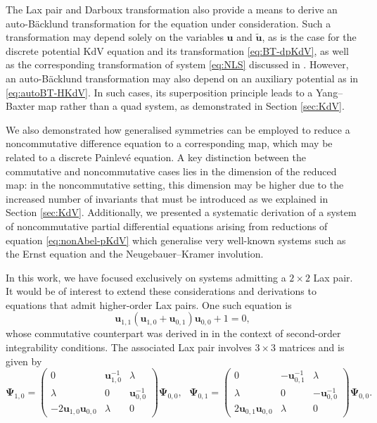 \documentclass[dvips,10pt]{article}
\newcommand{\bs}{\boldsymbol}
\newcommand{\bsu}{ {\bs{u}}}
\theoremstyle{remark} %
\begin{document}
	The Lax pair and Darboux transformation also provide a means to derive an auto-B\"acklund transformation for the equation under consideration. Such a transformation may depend solely on the variables $\bsu$ and $\tilde{\bsu}$, as is the case for the discrete potential KdV equation and its transformation \eqref{eq:BT-dpKdV}, as well as the corresponding transformation of system \eqref{eq:NLS} discussed in \cite{KRX}. However, an auto-B\"acklund transformation may also depend on an auxiliary potential as in \eqref{eq:autoBT-HKdV}. In such cases, its superposition principle leads to a Yang--Baxter map rather than a quad system, as demonstrated in Section \ref{sec:KdV}.
	
	We also demonstrated how generalised symmetries can be employed to reduce a noncommutative difference equation to a corresponding map, which may be related to a discrete Painlevé equation. A key distinction between the commutative and noncommutative cases lies in the dimension of the reduced map: in the noncommutative setting, this dimension may be higher due to the increased number of invariants that must be introduced as we explained in Section \ref{sec:KdV}. Additionally, we presented a systematic derivation of a system of noncommutative partial differential equations arising from reductions of equation \eqref{eq:nonAbel-pKdV} which generalise very well-known systems such as the Ernst equation and the Neugebauer--Kramer involution.
	
	In this work, we have focused exclusively on systems admitting a $2 \times 2$ Lax pair. It would be of interest to extend these considerations and derivations to equations that admit higher-order Lax pairs. One such equation is
	$$\bsu_{1,1} \left(\bsu_{1,0}+ \bsu_{0,1}\right) \bsu_{0,0} + 1 = 0,$$
	whose commutative counterpart was derived in \cite{MX} in the context of second-order integrability conditions. The associated Lax pair involves $3 \times 3$ matrices and is given by
	$${\bs{\Psi}}_{1,0} = \begin{pmatrix}
		0 &  \bsu_{1,0}^{-1} & \lambda \\ \lambda & 0 & \bsu_{0,0}^{-1} \\ -2 \bsu_{1,0} \bsu_{0,0} & \lambda & 0 
	\end{pmatrix}{\bs{\Psi}}_{0,0} , ~~~ 	{\bs{\Psi}}_{0,1} = \begin{pmatrix}
		0 &  -\bsu_{0,1}^{-1} & \lambda \\ \lambda & 0 & -\bsu_{0,0}^{-1} \\ 2 \bsu_{0,1} \bsu_{0,0} & \lambda & 0 
	\end{pmatrix}{\bs{\Psi}}_{0,0}.$$
	
\end{document}
